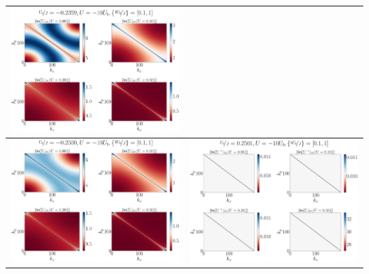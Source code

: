 \documentclass{report}
\numberwithin{equation}{section}
\begin{document}
\begin{center}
\begin{tabular}{c|c}
\includegraphics[height=0.3\textheight]{../figures/sigma-4-Ub_by_J=-0.23594-4.pdf}\\
\hline
\includegraphics[height=0.3\textheight]{../figures/sigma-4-Ub_by_J=-0.25000-4.pdf} &
\includegraphics[height=0.3\textheight]{../figures/sigma-4-Ub_by_J=0.25010-4.pdf}

\end{tabular}
\end{center}
\end{document}
